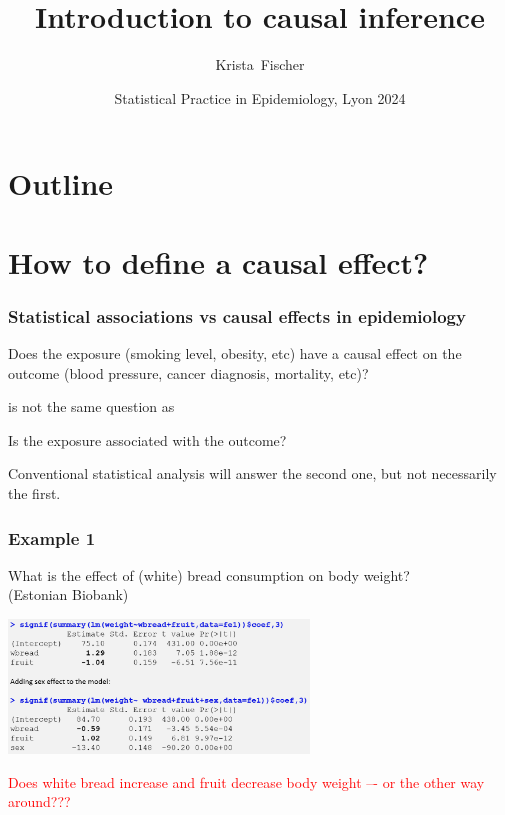 \documentclass[10pt,dvipsnames,t,handout%
,aspectratio=169%
]{beamer}%
\title{Introduction to causal inference}
\author{Krista~Fischer}
\institute[TY] %
{
  Institute of Mathematics and Statistics, University of Tartu \\
    Institute of Genomics, University of Tartu \\
   Estonian Academy of Sciences
}
\date[Lyon 2024] %
{Statistical Practice in Epidemiology, Lyon 2024}
\begin{document}
\begin{frame}
  \titlepage
\end{frame}

\section*{Outline}
\begin{frame}
\tableofcontents
\end{frame}

\section{How to define a causal effect?}

\begin{frame}
  \frametitle{Statistical associations vs causal effects in epidemiology}
  \begin{block}{}
  Does the exposure (smoking level, obesity, etc) have a \alert<2>{causal effect} on the outcome (blood pressure, cancer diagnosis, mortality, etc)?
  \end{block}
is not the same question as   
 \begin{block}{}
  Is the exposure \alert<3>{associated} with the outcome?
  \end{block}
 Conventional statistical analysis will answer the second one, but not necessarily the first. 
\end{frame}

\begin{frame}
	\frametitle{Example 1 }
	\begin{block}{}
		What is the effect of (white) bread consumption on body weight? \\
		(Estonian Biobank)
	\end{block}
	\includegraphics[width=8cm]{sai_egv}
	
	\begin{block}{}
		\textcolor{Red}{Does white bread increase and fruit decrease body weight –- or the other way around???}
	\end{block}
	\end{frame}
\end{document}

